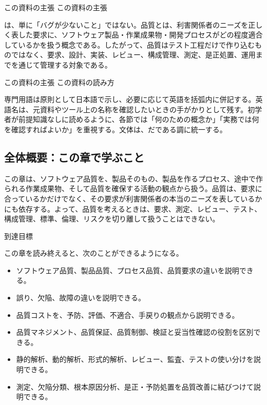 \documentclass[a4paper,11pt]{ltjsarticle}
\numberwithin{figure}{section}
\numberwithin{table}{section}
\begin{document}
\begin{pointbox}{この資料の主張}
この資料の主張\par
{}は、単に「バグが少ないこと」ではない。品質とは、利害関係者のニーズを正しく表した要求に、ソフトウェア製品・作業成果物・開発プロセスがどの程度適合しているかを扱う概念である。したがって、品質はテスト工程だけで作り込むものではなく、要求、設計、実装、レビュー、構成管理、測定、是正処置、運用までを通じて管理する対象である。
\end{pointbox}

\begin{pointbox}{この資料の主張}
この資料の読み方\par
専門用語は原則として日本語で示し、必要に応じて英語を括弧内に併記する。英語名は、元資料やツール上の名称を確認したいときの手がかりとして残す。初学者が前提知識なしに読めるように、各節では「何のための概念か」「実務では何を確認すればよいか」を重視する。文体は、だである調に統一する。
\end{pointbox}



\subsection*{全体概要：この章で学ぶこと}
この章は、ソフトウェア品質を、製品そのもの、製品を作るプロセス、途中で作られる作業成果物、そして品質を確保する活動の観点から扱う。品質は、要求に合っているかだけでなく、その要求が利害関係者の本当のニーズを表しているかにも依存する。よって、品質を考えるときは、要求、測定、レビュー、テスト、構成管理、標準、倫理、リスクを切り離して扱うことはできない。

到達目標\par
この章を読み終えると、次のことができるようになる。
\begin{itemize}
  \item ソフトウェア品質、製品品質、プロセス品質、品質要求の違いを説明できる。
  \item 誤り、欠陥、故障の違いを説明できる。
  \item 品質コストを、予防、評価、不適合、手戻りの観点から説明できる。
  \item 品質マネジメント、品質保証、品質制御、検証と妥当性確認の役割を区別できる。
  \item 静的解析、動的解析、形式的解析、レビュー、監査、テストの使い分けを説明できる。
  \item 測定、欠陥分類、根本原因分析、是正・予防処置を品質改善に結びつけて説明できる。
\end{itemize}
\end{document}
